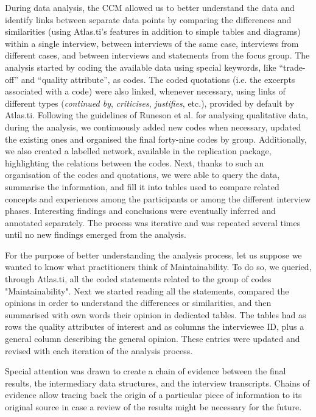 During data analysis, the CCM allowed us to better understand the data and identify links between separate data points by comparing the differences and similarities (using Atlas.ti's features in addition to simple tables and diagrams) within a single interview, between interviews of the same case, interviews from different cases, and between interviews and statements from the focus group.
The analysis started by coding the available data using special keywords, like ``trade-off'' and ``quality attribute'', as codes.
The coded quotations (i.e. the excerpts associated with a code) were also linked, whenever necessary, using links of different types (\textit{continued by}, \textit{criticises}, \textit{justifies}, etc.), provided by default by Atlas.ti.
Following the guidelines of Runeson et al. \cite{Runeson2012} for analysing qualitative data, during the analysis, we continuously added new codes when necessary, updated the existing ones and organised the final forty-nine codes by group.
Additionally, we also created a labelled network, available in the replication package, highlighting the relations between the codes.
Next, thanks to such an organisation of the codes and quotations, we were able to query the data, summarise the information, and fill it into tables used to compare related concepts and experiences among the participants or among the different interview phases. 
Interesting findings and conclusions were eventually inferred and annotated separately.
The process was iterative and was repeated several times until no new findings emerged from the analysis.

For the purpose of better understanding the analysis process, let us suppose we wanted to know what practitioners think of Maintainability. 
To do so, we queried, through Atlas.ti, all the coded statements related to the group of codes "Maintainability". Next we started reading all the statements, compared the opinions in order to understand the differences or similarities, and then summarised with own words their opinion in dedicated tables.
The tables had as rows the quality attributes of interest and as columns the interviewee ID, plus a general column describing the general opinion.
These entries were updated and revised with each iteration of the analysis process.

Special attention was drawn to create a chain of evidence between the final results, the intermediary data structures, and the interview transcripts.
Chains of evidence allow tracing back the origin of a particular piece of information to its original source in case a review of the results might be necessary for the future.

